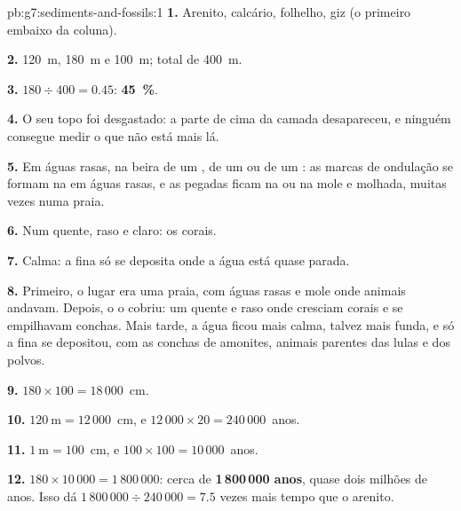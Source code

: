 \begin{solution}{pb:g7:sediments-and-fossils:1}
\textbf{1.} Arenito, calcário, folhelho, giz (o primeiro embaixo da
coluna).

\textbf{2.} \qty{120}{m}, \qty{180}{m} e \qty{100}{m}; total de
\qty{400}{m}.

\textbf{3.} $180 \div 400 = 0.45$: \textbf{45~\%}.

\textbf{4.} O seu topo foi desgastado: a parte de cima da camada
desapareceu, e ninguém consegue medir o que não está mais lá.

\textbf{5.} Em águas rasas, na beira de um , de um  ou de um :
as marcas de ondulação se formam na  em águas rasas, e as pegadas
ficam na  ou na  mole e molhada, muitas vezes numa praia.

\textbf{6.} Num  quente, raso e claro: os corais.

\textbf{7.} Calma: a  fina só se deposita onde a água está quase parada.

\textbf{8.} Primeiro, o lugar era uma praia, com águas rasas e 
mole onde animais andavam. Depois, o  o cobriu: um  quente e raso
onde cresciam corais e se empilhavam conchas. Mais tarde, a água ficou
mais calma, talvez mais funda, e só a  fina se depositou, com as
conchas de amonites, animais parentes das lulas e dos polvos.

\textbf{9.} $180 \times 100 = 18\,000$~cm.

\textbf{10.} $120~\text{m} = 12\,000$~cm, e $12\,000 \times 20 =
240\,000$~anos.

\textbf{11.} $1~\text{m} = 100$~cm, e $100 \times 100 = 10\,000$~anos.

\textbf{12.} $180 \times 10\,000 = 1\,800\,000$: cerca de
\textbf{1\,800\,000 anos}, quase dois milhões de anos. Isso dá
$1\,800\,000 \div 240\,000 = 7.5$ vezes mais tempo que o arenito.
\end{solution}
